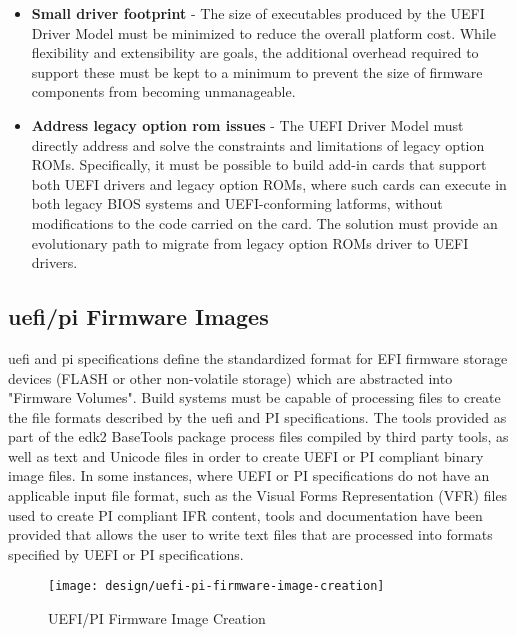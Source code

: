 \begin{itemize}
	\item \textbf{Small driver footprint} - The size of executables produced by the UEFI Driver Model must be minimized to reduce the overall platform cost. While flexibility and extensibility
	are goals, the additional overhead required to support these must be kept to a minimum to
	prevent the size of firmware components from becoming unmanageable.
	\item \textbf{Address legacy option rom issues} - The UEFI Driver Model must directly address and	solve the constraints and limitations of legacy option ROMs. Specifically, it must be
	possible to build add-in cards that support both UEFI drivers and legacy option ROMs,
	where such cards can execute in both legacy BIOS systems and UEFI-conforming latforms, without modifications to the code carried on the card. The solution must provide an evolutionary path to migrate from legacy option ROMs driver to UEFI drivers.
\end{itemize}

\subsection{\gls{uefi}/\gls{pi} Firmware Images}
\gls{uefi} and \gls{pi} specifications define the standardized format for EFI firmware storage devices (FLASH or other non-volatile storage) which are abstracted into "Firmware Volumes". Build systems must be capable of processing files to create the file formats described by the \gls{uefi} and PI specifications. The tools provided as part of the \gls{edk2} BaseTools package process files compiled by third party tools, as well as text and Unicode files in order to create UEFI or PI compliant binary image files. In some instances, where UEFI or PI specifications do not have an applicable input file format, such as the Visual Forms Representation (VFR) files used to create PI compliant IFR content, tools and documentation have been provided that allows the user to write text files that are processed into formats specified by UEFI or PI specifications.

\begin{figure}[h]
	\centering
	\texttt{[image: design/uefi-pi-firmware-image-creation]}
	\caption{UEFI/PI Firmware Image Creation}\label{fig:design-uefi-pi-firmware-image-creation}
\end{figure}


